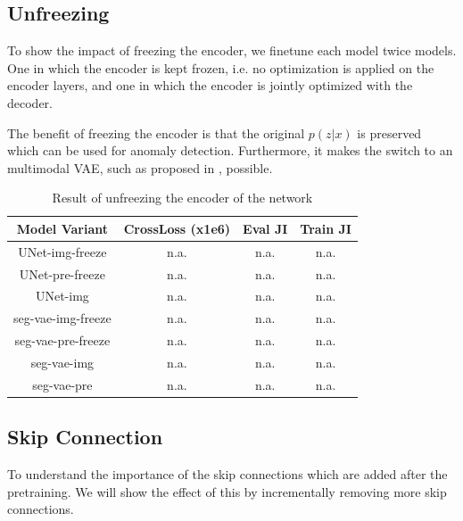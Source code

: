 \subsection{Unfreezing}
To show the impact of freezing the encoder, we finetune each model twice models. One in which the encoder is kept frozen, i.e. no optimization is applied on the encoder layers, and one in which the encoder is jointly optimized with the decoder.

The benefit of freezing the encoder is that the original $p(z |x)$ is preserved which can be used for anomaly detection. Furthermore, it makes the switch to an multimodal VAE, such as proposed in \cite{vasco2020mhvae}, possible.

\begin{table}[!ht]
    \centering
    \caption{Result of unfreezing the encoder of the network}
    \label{tab:abl-freeze-enc}
    \begin{tabular}{cccc}
        \hline
        Model Variant      & CrossLoss (x1e6) & Eval JI & Train JI \\
        \hline
        UNet-img-freeze    & n.a.             & n.a.    & n.a.     \\
        UNet-pre-freeze    & n.a.             & n.a.    & n.a.     \\
        UNet-img           & n.a.             & n.a.    & n.a.     \\
        seg-vae-img-freeze & n.a.             & n.a.    & n.a.     \\
        seg-vae-pre-freeze & n.a.             & n.a.    & n.a.     \\
        seg-vae-img        & n.a.             & n.a.    & n.a.     \\
        seg-vae-pre        & n.a.             & n.a.    & n.a.     \\
        \hline
    \end{tabular}
\end{table}

\subsection{Skip Connection}
To understand the importance of the skip connections which are added after the pretraining. We will show the effect of this by incrementally removing more skip connections.

